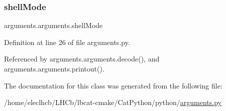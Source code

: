 \subsubsection{\texorpdfstring{shell\+Mode}{shellMode}}
{\footnotesize\ttfamily arguments.\+arguments.\+shell\+Mode}



Definition at line 26 of file arguments.\+py.



Referenced by arguments.\+arguments.\+decode(), and arguments.\+arguments.\+printout().



The documentation for this class was generated from the following file\+:\begin{DoxyCompactItemize}
\item 
/home/eleclhcb/\+L\+H\+Cb/lbcat-\/cmake/\+Cat\+Python/python/\hyperlink{arguments_8py}{arguments.\+py}\end{DoxyCompactItemize}
